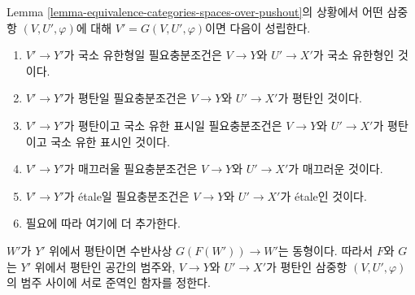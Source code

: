 \begin{lemma}
\label{lemma-equivalence-categories-spaces-pushout-flat}
Lemma \ref{lemma-equivalence-categories-spaces-over-pushout}의 상황에서
어떤 삼중항 $(V, U', \varphi)$에 대해
$V' = G(V, U', \varphi)$이면 다음이 성립한다.
\begin{enumerate}
\item $V' \to Y'$가 국소 유한형일 필요충분조건은
$V \to Y$와 $U' \to X'$가 국소 유한형인 것이다.
\item $V' \to Y'$가 평탄일 필요충분조건은
$V \to Y$와 $U' \to X'$가 평탄인 것이다.
\item $V' \to Y'$가 평탄이고 국소 유한 표시일 필요충분조건은
$V \to Y$와 $U' \to X'$가 평탄이고 국소 유한 표시인 것이다.
\item $V' \to Y'$가 매끄러울 필요충분조건은
$V \to Y$와 $U' \to X'$가 매끄러운 것이다.
\item $V' \to Y'$가 \'etale일 필요충분조건은
$V \to Y$와 $U' \to X'$가 \'etale인 것이다.
\item 필요에 따라 여기에 더 추가한다.
\end{enumerate}
$W'$가 $Y'$ 위에서 평탄이면 수반사상
$G(F(W')) \to W'$는 동형이다. 따라서 $F$와 $G$는
$Y'$ 위에서 평탄인 공간의 범주와, $V \to Y$와 $U' \to X'$가
평탄인 삼중항 $(V, U', \varphi)$의 범주 사이에 서로 준역인 함자를 정한다.
\end{lemma}

